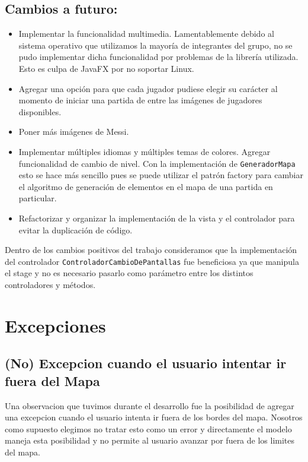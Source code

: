 \documentclass[titlepage,a4paper]{article}
\begin{document}
\subsection{Cambios a futuro:}
\label{sec:org38e894e}

\begin{itemize}
\item Implementar la funcionalidad multimedia. Lamentablemente debido al
sistema operativo que utilizamos la mayoría de integrantes del grupo,
no se pudo implementar dicha funcionalidad por problemas de la
librería utilizada. Esto es culpa de JavaFX por no soportar Linux.

\item Agregar una opción para que cada jugador pudiese elegir su carácter al
momento de iniciar una partida de entre las imágenes de jugadores
disponibles.

\item Poner más imágenes de Messi.

\item Implementar múltiples idiomas y múltiples temas de colores.
Agregar funcionalidad de cambio de nivel. Con la implementación de
\texttt{GeneradorMapa} esto se hace más sencillo pues se puede utilizar el
patrón factory para cambiar el algoritmo de generación de elementos en
el mapa de una partida en particular.

\item Refactorizar y organizar la implementación de la vista y el
controlador para evitar la duplicación de código.
\end{itemize}

Dentro de los cambios positivos del trabajo consideramos que la
implementación del controlador \texttt{ControladorCambioDePantallas} fue
beneficiosa ya que manipula el stage y no es necesario pasarlo como
parámetro entre los distintos controladores y métodos.

\section{Excepciones}
\label{sec:org6f3aa38}
\subsection{(No) Excepcion cuando el usuario intentar ir fuera del Mapa}
\label{sec:org97d8da8}

Una observacion que tuvimos durante el desarrollo fue la posibilidad
de agregar una excepcion cuando el usuario intenta ir fuera de los
bordes del mapa. Nosotros como supuesto elegimos no tratar esto como
un error y directamente el modelo maneja esta posibilidad y no permite
al usuario avanzar por fuera de los limites del mapa.
\end{document}
